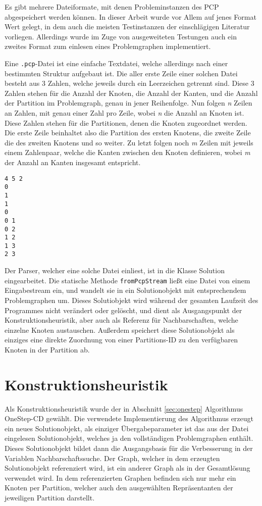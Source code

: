 Es gibt mehrere Dateiformate, mit denen Probleminstanzen des PCP abgespeichert werden können. In dieser Arbeit wurde vor Allem auf jenes
Format Wert gelegt, in dem auch die meisten Testinstanzen der einschlägigen Literatur vorliegen. Allerdings wurde im Zuge von ausgeweiteten 
Testungen auch ein zweites Format zum einlesen eines Problemgraphen implementiert. 

Eine \texttt{.pcp}-Datei ist eine einfache Textdatei, welche allerdings nach einer bestimmten Struktur aufgebaut ist. Die aller erste Zeile
einer solchen Datei besteht aus 3 Zahlen, welche jeweils durch ein Leerzeichen getrennt sind. Diese 3 Zahlen stehen für die Anzahl der Knoten, 
die Anzahl der Kanten, und die Anzahl der Partition im Problemgraph, genau in jener Reihenfolge. Nun folgen \textit{n} Zeilen an Zahlen, mit 
genau einer Zahl pro Zeile, wobei \textit{n} die Anzahl an Knoten ist. Diese Zahlen stehen für die Partitionen, denen die Knoten zugeordnet werden.
Die erste Zeile beinhaltet also die Partition des ersten Knotens, die zweite Zeile die des zweiten Knotens und so weiter. Zu letzt folgen noch
\textit{m} Zeilen mit jeweils einem Zahlenpaar, welche die Kanten zwischen den Knoten definieren, wobei \textit{m} der Anzahl an Kanten insgesamt
entspricht.

\singlespacing
\begin{lstlisting}[caption={Eine einfache \textit{.pcp}-Beispieldatei},label={lst:pcp}]
4 5 2
0
1
1
0
0 1
0 2
1 2
1 3
2 3
\end{lstlisting}

Der Parser, welcher eine solche Datei einliest, ist in die Klasse Solution eingearbeitet. Die statische Methode \texttt{fromPcpStream} ließt eine
Datei von einem Eingabestream ein, und wandelt sie in ein Solutionobjekt mit entsprechendem Problemgraphen um. Dieses Solutiobjekt wird während
der gesamten Laufzeit des Programmes nicht verändert oder gelöscht, und dient als Ausgangspunkt der Konstruktionsheuristik, aber auch als
Referenz für Nachbarschaften, welche einzelne Knoten austauschen. Außerdem speichert diese Solutionobjekt als einziges eine direkte Zuordnung von einer Partitions-ID
zu den verfügbaren Knoten in der Partition ab. 

\section{Konstruktionsheuristik}
Als Konstruktionsheuristik wurde der in Abschnitt \ref{sec:onestep} Algorithmus OneStep-CD gewählt. Die verwendete Implementierung des Algorithmus
erzeugt ein neues Solutionobjekt, als einziger Übergabeparameter ist das aus der Datei eingelesen Solutionobjekt, welches ja den vollständigen Problemgraphen
enthält. Dieses Solutionobjekt bildet dann die Ausgangsbasis für die Verbesserung in der Variablen Nachbarschaftssuche. Der Graph, welcher in dem erzeugten Solutionobjekt
referenziert wird, ist ein anderer Graph als in der Gesamtlösung verwendet wird. In dem referenzierten Graphen befinden sich nur mehr ein Knoten per Partition, welcher auch den
ausgewählten Repräsentanten der jeweiligen Partition darstellt. 

